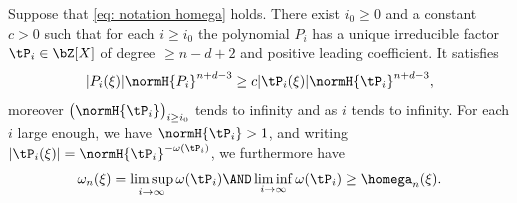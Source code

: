 \begin{Lem}
\label{lem: existence facteur irreductible grand}
Suppose that \eqref{eq: notation homega} holds. There exist $i_0\geq 0$ and a constant $c>0$ such that for each $i\geq i_0$ the polynomial $P_i$ has a unique irreducible factor $\tP_i\in\bZ[X]$ of degree $\geq n-d+2$ and positive leading coefficient. It satisfies
\begin{equation}
\label{eq lem: existence facteur irr grand eq 2}
|P_i(\xi)| \normH{P_i}^{n+d-3} \geq c|\tP_i(\xi)| \normH{\tP_i}^{n+d-3},
\end{equation}
moreover $\big(\normH{\tP_i}\big)_{i\geq i_0}$ tends to infinity and as $i$ tends to infinity. For each $i$ large enough, we have $\normH{\tP_i}>1$, and writing $|\tP_i(\xi)| = \normH{\tP_i}^{-\omega(\tP_i)}$, we furthermore have
\begin{equation}
\label{eq lem: existence facteur irr grand eq 1}
\omega_n(\xi) = \limsup_{i\to\infty} \omega(\tP_i) \AND \liminf_{i\to\infty} \omega(\tP_i) \geq \homega_n(\xi).
\end{equation}
\end{Lem}

